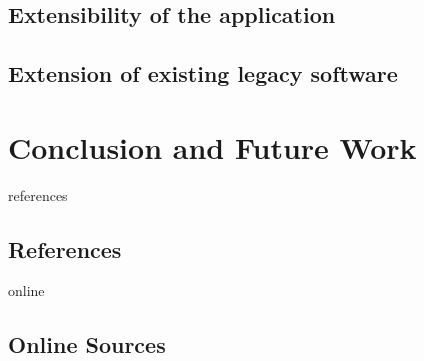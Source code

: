 \documentclass[12pt,a4paper,twoside]{report}
\begin{document}
\section{Extensibility of the application}

\section{Extension of existing legacy software}



\chapter{Conclusion and Future Work} \label{chap:conclusion}




\newpage

\listoffigures
\newpage


\begin{btSect}{references}
\section*{References}
\btPrintCited
\end{btSect}
\begin{btSect}{online}
\section*{Online Sources}
\btPrintCited
\end{btSect}
\end{document}
